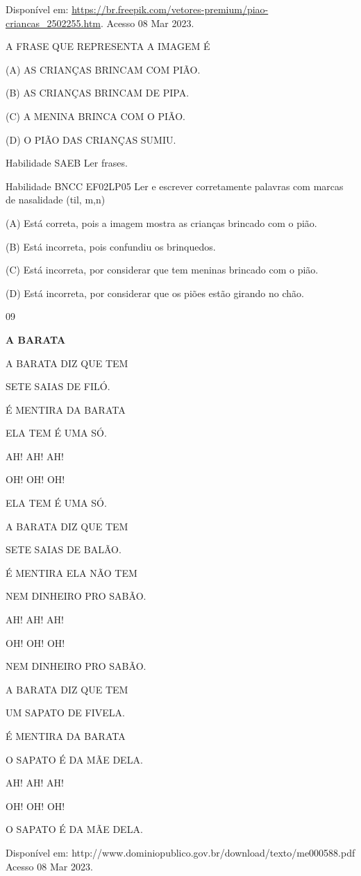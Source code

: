 {{{{{{Disponível em:
\url{https://br.freepik.com/vetores-premium/piao-criancas_2502255.htm}.
Acesso 08 Mar 2023.

A FRASE QUE REPRESENTA A IMAGEM É

(A) AS CRIANÇAS BRINCAM COM PIÃO.

(B) AS CRIANÇAS BRINCAM DE PIPA.

(C) A MENINA BRINCA COM O PIÃO.

(D) O PIÃO DAS CRIANÇAS SUMIU.

Habilidade SAEB Ler frases.

Habilidade BNCC EF02LP05 Ler e escrever corretamente palavras com marcas
de nasalidade (til, m,n)

(A) Está correta, pois a imagem mostra as crianças brincado com o pião.

(B) \protect\hypertarget{_Hlk129156663}{}{}Está incorreta, pois
confundiu os brinquedos.

(C) Está incorreta, por considerar que tem meninas brincado com o pião.

(D) Está incorreta, por considerar que os piões estão girando no chão.

\num{09}

\textbf{A BARATA}

A BARATA DIZ QUE TEM

SETE SAIAS DE FILÓ.

É MENTIRA DA BARATA

ELA TEM É UMA SÓ.

AH! AH! AH!

OH! OH! OH!

ELA TEM É UMA SÓ.

A BARATA DIZ QUE TEM

SETE SAIAS DE BALÃO.

É MENTIRA ELA NÃO TEM

NEM DINHEIRO PRO SABÃO.

AH! AH! AH!

OH! OH! OH!

NEM DINHEIRO PRO SABÃO.

A BARATA DIZ QUE TEM

UM SAPATO DE FIVELA.

É MENTIRA DA BARATA

O SAPATO É DA MÃE DELA.

AH! AH! AH!

OH! OH! OH!

O SAPATO É DA MÃE DELA.

Disponível em:
http://www.dominiopublico.gov.br/download/texto/me000588.pdf Acesso 08
Mar 2023.

}}}}}}
